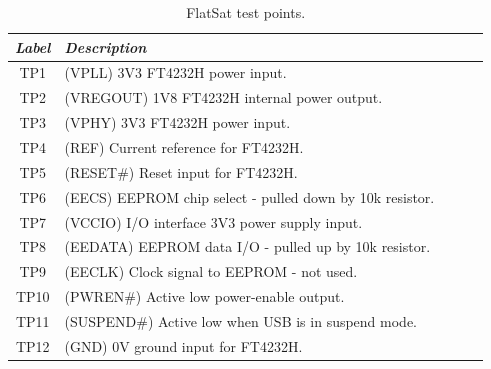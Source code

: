 \begin{table}[!h]
    \centering
    \begin{tabular}{cllll}
        \toprule[1.5pt]
        \textit{Label} & \textit{Description} \\
        \midrule
        TP1                & (VPLL) 3V3 FT4232H power input. \\
        TP2                & (VREGOUT) 1V8 FT4232H internal power output. \\
        TP3                & (VPHY) 3V3 FT4232H power input. \\
        TP4                & (REF) Current reference for FT4232H. \\
        TP5                & (RESET\#) Reset input for FT4232H. \\
        TP6                & (EECS) EEPROM chip select - pulled down by 10k resistor. \\
        TP7                & (VCCIO) I/O interface 3V3 power supply input. \\
        TP8                & (EEDATA) EEPROM data I/O - pulled up by 10k resistor. \\
        TP9                & (EECLK) Clock signal to EEPROM - not used. \\
        TP10               & (PWREN\#) Active low power-enable output. \\
        TP11               & (SUSPEND\#) Active low when USB is in suspend mode. \\
        TP12               & (GND) 0V ground input for FT4232H.\\
        \bottomrule[1.5pt]
    \end{tabular}
    \caption{FlatSat test points.}
    \label{tab:testpoints}
\end{table}
